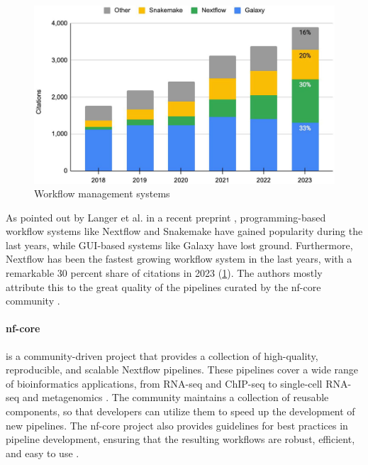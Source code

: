 \begin{figure}[ht]
    \centering

    \includegraphics[width=\textwidth]{chapters/3_materials_and_methods/figures/nextflow_usage.jpg}
    \caption{Workflow management systems} %
    \label{fig:nextflow_usage}
\end{figure}

As pointed out by Langer et al.
in a recent preprint
\supercite{langer_empowering_2024}, programming-based workflow systems like
Nextflow and Snakemake have gained popularity during the last years, while
GUI-based systems like Galaxy have lost ground.
Furthermore, Nextflow has been the fastest growing workflow system in the last
years, with a remarkable 30 percent share of citations in 2023
(\cref{fig:nextflow_usage}).
The authors mostly attribute this to the great quality of the pipelines curated
by the nf-core community
\supercite{langer_empowering_2024,grayson_automatic_2023}.

\paragraph{nf-core} is a community-driven project that provides a collection of
high-quality, reproducible, and scalable Nextflow pipelines.
These pipelines cover a wide range of bioinformatics applications, from RNA-seq
and ChIP-seq to single-cell RNA-seq and metagenomics
\supercite{ewels_nf-core_2020}.
The community maintains a collection of reusable components, so that developers
can utilize them to speed up the development of new pipelines.
The nf-core project also provides guidelines for best practices in pipeline
development, ensuring that the resulting workflows are robust, efficient, and
easy to use \supercite{ewels_nf-core_2020}.

